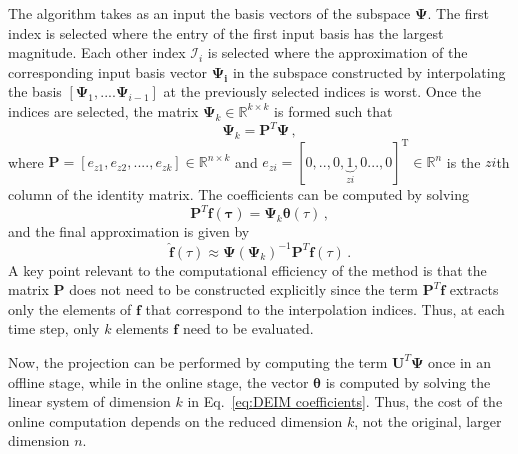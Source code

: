 \documentclass[review,number,sort&compress,12pt]{elsarticle}
\begin{document}
The algorithm takes as an input the basis vectors of the subspace $\mathbf{\Psi}$.
The first index is selected where the entry of the first input basis has the largest magnitude.
Each other index $\mathcal{I}_i$ is selected where the approximation of the corresponding input basis vector $\mathbf{\Psi_i}$ in the subspace constructed by interpolating the basis $[\mathbf{\Psi}_1, ....\mathbf{\Psi}_{i-1}]$ at the previously selected indices is worst.
Once the indices are selected, the matrix $\mathbf{\Psi}_k \in \mathbb{R}^{k\times k}$ is formed such that
\begin{equation}
\mathbf{\Psi}_k = \mathbf{P}^T\mathbf{\Psi}\, ,
\end{equation}
where $\mathbf{P} = [e_{z1}, e_{z2}, ....,e_{zk}] \in \mathbb{R}^{n\times k}$ and $e_{zi} = [0,.., 0, \underbrace{1}_{{zi}}, 0..., 0]^\text{T} \in \mathbb{R}^{n}$
is the  ${zi}$th column of the identity matrix.
The coefficients can be computed by solving
\begin{equation}
\mathbf{P}^T\mathbf{f(\tau)}=\mathbf{\Psi}_k \boldsymbol{\theta}(\tau)\, ,
\label{eq:DEIM coefficients}
\end{equation}
and the final approximation is given by
\begin{equation}
\hat{\mathbf{f}}(\tau)\approx\mathbf{\Psi}( \mathbf{\Psi}_k)^{-1}\mathbf{P}^T\mathbf{f} (\tau)\, .
\end{equation}
A key point relevant to the computational efficiency of the method is that the matrix $\mathbf{P}$ does not need to be constructed explicitly since the term $\mathbf{P}^T\mathbf{f}$ extracts only the elements of $\mathbf{f}$ that correspond to the interpolation indices.
Thus, at each time step, only $k$ elements $\mathbf{f}$ need to be evaluated.

Now, the projection can be performed by computing the term $\mathbf{U}^T \mathbf{\Psi}$ once in an offline stage, while in the online stage, the vector $\boldsymbol{\theta}$ is computed by solving the linear system of dimension $k$ in Eq.~\ref{eq:DEIM coefficients}.
Thus, the cost of the online computation depends on the reduced dimension $k$, not the original, larger dimension $n$.
\end{document}
